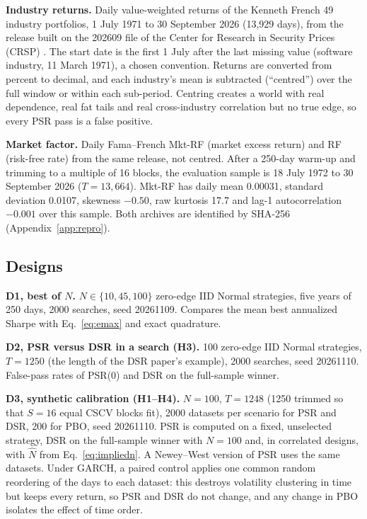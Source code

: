 \documentclass[11pt,a4paper]{article}
\begin{document}
\textbf{Industry returns.} Daily value-weighted returns of the Kenneth French 49 industry portfolios, 1 July 1971 to 30 September 2026 (13,929 days), from the release built on the 202609 file of the Center for Research in Security Prices (CRSP) \citep{french2026data}. The start date is the first 1 July after the last missing value (software industry, 11 March 1971), a chosen convention. Returns are converted from percent to decimal, and each industry's mean is subtracted (``centred'') over the full window or within each sub-period. Centring creates a world with real dependence, real fat tails and real cross-industry correlation but no true edge, so every PSR pass is a false positive.

\textbf{Market factor.} Daily Fama--French Mkt-RF (market excess return) and RF (risk-free rate) from the same release, not centred. After a 250-day warm-up and trimming to a multiple of 16 blocks, the evaluation sample is 18 July 1972 to 30 September 2026 ($T=13{,}664$). Mkt-RF has daily mean 0.00031, standard deviation 0.0107, skewness $-0.50$, raw kurtosis 17.7 and lag-1 autocorrelation $-0.001$ over this sample. Both archives are identified by SHA-256 (Appendix~\ref{app:repro}).

\subsection{Designs}
\textbf{D1, best of $N$.} $N\in\{10,45,100\}$ zero-edge IID Normal strategies, five years of 250 days, 2000 searches, seed 20261109. Compares the mean best annualized Sharpe with Eq.~\eqref{eq:emax} and exact quadrature.

\textbf{D2, PSR versus DSR in a search (H3).} 100 zero-edge IID Normal strategies, $T=1250$ (the length of the DSR paper's example), 2000 searches, seed 20261110. False-pass rates of PSR(0) and DSR on the full-sample winner.

\textbf{D3, synthetic calibration (H1--H4).} $N=100$, $T=1248$ (1250 trimmed so that $S=16$ equal CSCV blocks fit), 2000 datasets per scenario for PSR and DSR, 200 for PBO, seed 20261110. PSR is computed on a fixed, unselected strategy, DSR on the full-sample winner with $N=100$ and, in correlated designs, with $\hat N$ from Eq.~\eqref{eq:impliedn}. A Newey--West version of PSR uses the same datasets. Under GARCH, a paired control applies one common random reordering of the days to each dataset: this destroys volatility clustering in time but keeps every return, so PSR and DSR do not change, and any change in PBO isolates the effect of time order.
\end{document}
